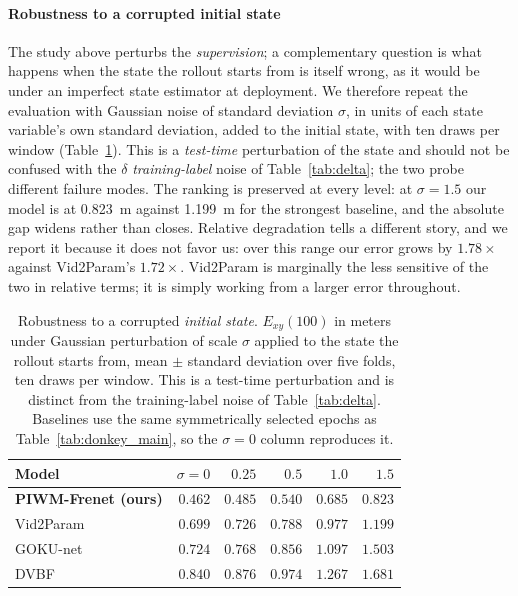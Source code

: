 \documentclass[preprint,12pt]{elsarticle}
\begin{document}
\paragraph{Robustness to a corrupted initial state}
The study above perturbs the \emph{supervision}; a complementary question is what
happens when the state the rollout starts from is itself wrong, as it would be
under an imperfect state estimator at deployment.
We therefore repeat the evaluation with Gaussian noise of standard deviation
$\sigma$, in units of each state variable's own standard deviation, added to the
initial state, with ten draws per window (Table~\ref{tab:noise}).
This is a \emph{test-time} perturbation of the state and should not be confused
with the $\delta$ \emph{training-label} noise of Table~\ref{tab:delta}; the two
probe different failure modes.
The ranking is preserved at every level: at $\sigma = 1.5$ our model is at
\SI{0.823}{m} against \SI{1.199}{m} for the strongest baseline, and the absolute
gap widens rather than closes.
Relative degradation tells a different story, and we report it because it does not
favor us: over this range our error grows by $1.78\times$ against Vid2Param's
$1.72\times$. Vid2Param is marginally the less sensitive of the two in relative
terms; it is simply working from a larger error throughout.

\begin{table}[t]
\centering
\caption{Robustness to a corrupted \emph{initial state}. $E_{xy}(100)$ in meters
under Gaussian perturbation of scale $\sigma$ applied to the state the rollout
starts from, mean $\pm$ standard deviation over five folds, ten draws per window.
This is a test-time perturbation and is distinct from the training-label noise of
Table~\ref{tab:delta}. Baselines use the same symmetrically selected epochs as
Table~\ref{tab:donkey_main}, so the $\sigma = 0$ column reproduces it.}
\label{tab:noise}
\small
\begin{tabular}{lrrrrr}
\toprule
Model & $\sigma = 0$ & $0.25$ & $0.5$ & $1.0$ & $1.5$ \\
\midrule
\textbf{PIWM-Frenet (ours)} & $\mathbf{0.462}$ & $\mathbf{0.485}$ & $\mathbf{0.540}$ & $\mathbf{0.685}$ & $\mathbf{0.823}$ \\
Vid2Param                   & $0.699$ & $0.726$ & $0.788$ & $0.977$ & $1.199$ \\
GOKU-net                    & $0.724$ & $0.768$ & $0.856$ & $1.097$ & $1.503$ \\
DVBF                        & $0.840$ & $0.876$ & $0.974$ & $1.267$ & $1.681$ \\
\bottomrule
\end{tabular}
\end{table}
\end{document}
